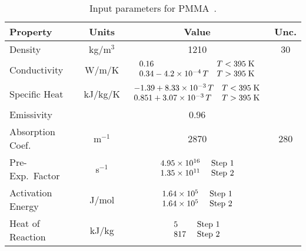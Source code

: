 \begin{table}[!h]
\caption[NIST PMMA properties]{Input parameters for PMMA~\cite{Fiola:FSJ2021}.}
\begin{center}
\begin{tabular}{|l|c|c|c|}
\hline
Property                    & Units         & Value                                                                                                                                        & Unc.           \\ \hline \hline
Density                     & kg/m$^3$      & 1210                                                                                                                                         & 30             \\ \hline
Conductivity                & W/m/K         & $\begin{array}{ll} 0.16  & T<395 \; \hbox{K} \\  0.34 - 4.2 \times 10^{-4} \, T  & T>395 \; \hbox{K} \end{array}$                            &                \\ \hline
Specific Heat               & kJ/kg/K       & $\begin{array}{ll} -1.39+ 8.33 \times 10^{-3} \, T & T<395 \; \hbox{K} \\ 0.851 + 3.07 \times 10^{-3} \, T & T>395 \; \hbox{K} \end{array}$  &                \\ \hline
Emissivity                  &               & 0.96                                                                                                                                         &                \\ \hline
Absorption Coef.            & m$^{-1}$      & 2870                                                                                                                                         & 280            \\ \hline
Pre-Exp.~Factor             & s$^{-1}$      & $\begin{array}{ll} 4.95 \times 10^{16} & \hbox{ Step 1} \\ 1.35 \times 10^{11} & \hbox{ Step 2} \end{array}$                                 &                \\ \hline
Activation Energy           & J/mol         & $\begin{array}{ll} 1.64 \times 10^{5}  & \hbox{ Step 1} \\ 1.64 \times 10^{5}  & \hbox{ Step 2} \end{array}$                                 &                \\ \hline
Heat of Reaction            & kJ/kg         & $\begin{array}{ll} 5                   & \hbox{ Step 1} \\ 817                 & \hbox{ Step 2} \end{array}$                                 &                \\ \hline
\end{tabular}
\end{center}
\label{NIST_PMMA_Properties}
\end{table}


